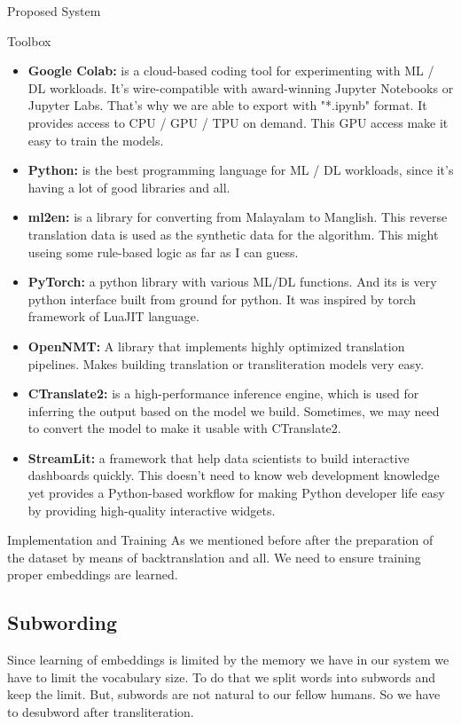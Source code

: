 \begin{chapter}{Proposed System}
    \begin{section}{Toolbox}
    \begin{itemize}
        \item \textbf{Google Colab:} is a cloud-based coding tool for experimenting with ML / DL workloads. It's wire-compatible with award-winning Jupyter Notebooks or Jupyter Labs. That's why we are able to export with "*.ipynb" format. It provides access to CPU / GPU / TPU on demand. This GPU access make it easy to train the models.
       \item \textbf{Python:} is the best programming language for ML / DL workloads, since it's having a lot of good libraries and all.
        \item \textbf{ml2en:} is a library for converting from Malayalam to Manglish. This reverse translation data is used as the synthetic data for the algorithm. This might useing some rule-based logic as far as I can guess.
        \item \textbf{PyTorch:} a python library with various ML/DL functions. And its is very python interface built from ground for python. It was inspired by torch framework of LuaJIT language.
        \item \textbf{OpenNMT: } A library that implements highly optimized translation pipelines. Makes building translation or transliteration models very easy.
        \item \textbf{CTranslate2:} is a high-performance inference engine, which is used for inferring the output based on the model we build. Sometimes, we may need to convert the model to make it usable with CTranslate2.
        \item \textbf{StreamLit:} a framework that help data scientists to build interactive dashboards quickly. This doesn't need to know web development knowledge yet provides a Python-based workflow for making Python developer life easy by providing high-quality interactive widgets.
    \end{itemize}
    \end{section}

    \begin{section}{Implementation and Training} 
        As we mentioned before after the preparation of the dataset by means of backtranslation and all. We need to ensure training proper embeddings are learned.

        \subsection{Subwording}
        Since learning of embeddings is limited by the memory we have in our system we have to limit the vocabulary size. To do that we split words into subwords and keep the limit. But, subwords are not natural to our fellow humans. So we have to desubword after transliteration.


\end{section}
\end{chapter}
